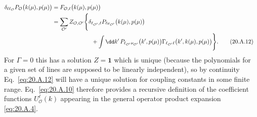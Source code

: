 \begin{align}
\delta_{\ell\ell_{\mathcal O}}
P_{\mathcal O}\bigl(k(\mu),p(\mu)\bigr)
&=F_{\mathcal O,\ell}\bigl(k(\mu),p(\mu)\bigr)
\notag\\
&=\sum_{\mathcal O'}Z_{\mathcal O,\mathcal O'}
\Bigg\{
\delta_{\ell_{\mathcal O'},\ell}
P_{\ell\nu_{\mathcal O'}}\bigl(k(\mu),p(\mu)\bigr)
\notag\\
&\hspace{24mm}
+\int \dd k'\,
P_{\ell_{\mathcal O'}\nu_{\mathcal O'}}\bigl(k',p(\mu)\bigr)
\Gamma_{\ell_{\mathcal O'}\ell}
\bigl(k',k(\mu),p(\mu)\bigr)
\Bigg\}.
\tag{20.A.12}\label{eq:20.A.12}
\end{align}
For $\Gamma=0$ this has a solution $Z=\mathbf{1}$ which is unique (because the polynomials for a given set of lines are supposed to be linearly independent), so by continuity Eq.~\eqref{eq:20.A.12} will have a unique solution for coupling constants in some finite range. Eq.~\eqref{eq:20.A.10} therefore provides a recursive definition of the coefficient functions $U_{\mathcal O}^{\ell}(k)$ appearing in the general operator product expansion \eqref{eq:20.A.4}.
